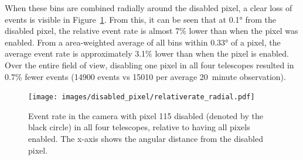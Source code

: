     When these bins are combined radially around the disabled pixel, a clear loss of events is visible in Figure~\ref{fig:dpix_rel_radial}.
    From this, it can be seen that at \ang{0.1} from the disabled pixel, the relative event rate is almost 7\% lower than when the pixel was enabled.
    From a area-weighted average of all bins within \ang{0.33} of a pixel, the average event rate is approximately 3.1\% lower than when the pixel is enabled.
    Over the entire field of view, disabling one pixel in all four telescopes resulted in 0.7\% fewer events (14900 events vs 15010 per average \SI{20}{minute} observation).
    
    \begin{figure}[!ht]
      \centering
      \texttt{[image: images/disabled\_pixel/relativerate\_radial.pdf]}
      \caption[Relative Event Rate After Disabling Camera Pixels]{
        Event rate in the camera with pixel 115 disabled (denoted by the black circle) in all four telescopes, relative to having all pixels enabled.
        The x-axis shows the angular distance from the disabled pixel.
      }
      \label{fig:dpix_rel_radial}
    \end{figure}

    
    
